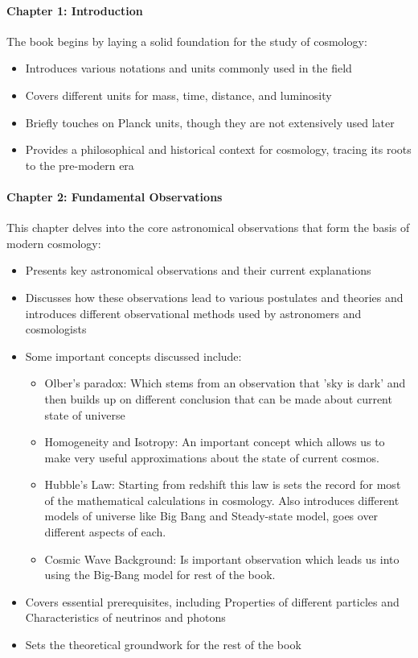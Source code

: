\documentclass[11pt]{article}
\begin{document}
\paragraph{Chapter 1: Introduction}

The book begins by laying a solid foundation for the study of cosmology:

\begin{itemize}
	\item Introduces various notations and units commonly used in the field
	\item Covers different units for mass, time, distance, and luminosity
	\item Briefly touches on Planck units, though they are not extensively used later
	\item Provides a philosophical and historical context for cosmology, tracing its roots
		to the pre-modern era
\end{itemize}

\paragraph{Chapter 2: Fundamental Observations}

This chapter delves into the core astronomical observations that form the basis of modern cosmology:

\begin{itemize}
	\item Presents key astronomical observations and their current explanations
	\item Discusses how these observations lead to various postulates and
		theories and introduces different observational methods used by
		astronomers and cosmologists
	\item Some important concepts discussed include:
		\begin{itemize}
			\item Olber's paradox: Which stems from an observation
				that 'sky is dark' and then builds up on
				different conclusion that can be made about
				current state of universe
			\item Homogeneity and Isotropy: An important concept
				which allows us to make very useful
				approximations about the state of current
				cosmos.
			\item Hubble's Law: Starting from redshift this law is
				sets the record for most of the mathematical
				calculations in cosmology. Also introduces
				different models of universe like Big Bang and
				Steady-state model, goes over different aspects
				of each.
			\item Cosmic Wave Background: Is important observation
				which leads us into using the Big-Bang model for
				rest of the book.
		\end{itemize}
	\item Covers essential prerequisites, including Properties of different particles and Characteristics of neutrinos and photons
	\item Sets the theoretical groundwork for the rest of the book

\end{itemize}
\end{document}
